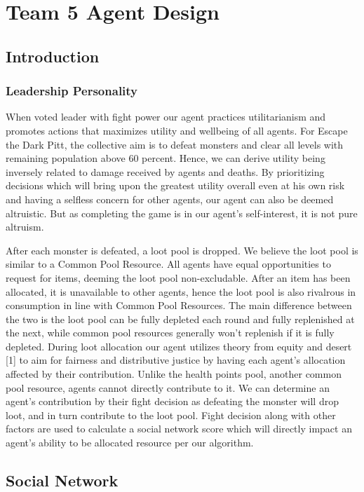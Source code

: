 \useunder{\uline}{\ul}{}
\chapter{Team 5 Agent Design}\label{team_5_agent_design}
\section{Introduction}
\subsection{Leadership Personality}
\noindent When voted leader with fight power our agent practices utilitarianism and promotes actions that maximizes utility and wellbeing of all agents. For Escape the Dark Pitt, the collective aim is to defeat monsters and clear all levels with remaining population above 60 percent. Hence, we can derive utility being inversely related to damage received by agents and deaths. By prioritizing decisions which will bring upon the greatest utility overall even at his own risk and having a selfless concern for other agents, our agent can also be deemed altruistic. But as completing the game is in our agent’s self-interest, it is not pure altruism.
\medskip

\noindent After each monster is defeated, a loot pool is dropped. We believe the loot pool is similar to a Common Pool Resource. All agents have equal opportunities to request for items, deeming the loot pool non-excludable. After an item has been allocated, it is unavailable to other agents, hence the loot pool is also rivalrous in consumption in line with Common Pool Resources. The main difference between the two is the loot pool can be fully depleted each round and fully replenished at the next, while common pool resources generally won’t replenish if it is fully depleted. During loot allocation our agent utilizes theory from equity and desert [1] to aim for fairness and distributive justice by having each agent’s allocation affected by their contribution. Unlike the health points pool, another common pool resource, agents cannot directly contribute to it. We can determine an agent’s contribution by their fight decision as defeating the monster will drop loot, and in turn contribute to the loot pool. Fight decision along with other factors are used to calculate a social network score which will directly impact an agent’s ability to be allocated resource per our algorithm.


\section{Social Network}

